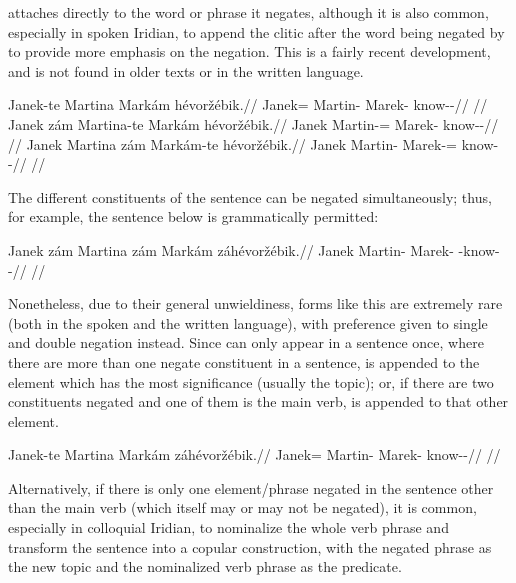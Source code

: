  attaches directly to the word or phrase it negates, although it is also common, especially in spoken Iridian, to append the clitic  after the word being negated by  to provide more emphasis on the negation. This is a fairly recent development, and is not found in older texts or in the written language.

\pex
\a
\begingl
     Janek{-te} Martina Markám hévoržébik.//
    \glb \Neg{} Janek=\Foc{} Martin-\Acc{} Marek-\Agt{} know-\Ben{}-\Pf{}//
    \glft {}//
\endgl
\a
\begingl
    \gla Janek {zám} Martina{-te} Markám hévoržébik.//
    \glb Janek \Neg{} Martin-\Acc{}=\Foc{} Marek-\Agt{} know-\Ben{}-\Pf{}//
    \glft {}//
\endgl
\a
\begingl
    \gla Janek Martina {zám} Markám{-te} hévoržébik.//
    \glb Janek Martin-\Acc{} \Neg{} Marek-\Agt{}=\Foc{} know-\Ben{}-\Pf{}//
    \glft {}//
\endgl
\xe

The different constituents of the sentence can be negated simultaneously; thus,
for example, the sentence below is grammatically permitted:

\pex
\begingl
     Janek {zám} Martina {zám} Markám {zá}hévoržébik.//
    \glb \Neg{} Janek \Neg{} Martin-\Acc{} \Neg{} Marek-\Agt{} \Neg{}-know-\Ben{}-\Pf{}//
    \glft {}//
\endgl
\xe

Nonetheless, due to their general unwieldiness, forms like this are extremely
rare (both in the spoken and the written language), with preference given to
single and double negation instead. Since  can only appear in a
sentence once, where there are more than one negate constituent in a sentence,
 is appended to the element which has the most significance (usually
the topic); or, if there are two constituents negated and one of them is the
main verb,  is appended to that other element.

\pex
\begingl
     Janek{-te} Martina Markám {zá}hévoržébik.//
    \glb \Neg{} Janek=\Foc{} Martin-\Acc{} Marek-\Agt{} \Neg{}know-\Ben{}-\Pf{}//
    \glft {}//
\endgl
\xe

Alternatively, if there is only one element/phrase negated in the sentence other than the main verb (which itself may or may not be negated), it is common, especially in colloquial Iridian, to nominalize the whole verb phrase and transform the sentence into a copular construction, with the negated phrase as the new topic and the nominalized verb phrase as the predicate.

